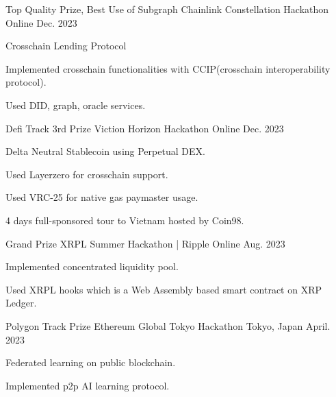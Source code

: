 




\begin{cventries}


\cventry
{Top Quality Prize, Best Use of Subgraph}
{Chainlink Constellation Hackathon}
{Online}
{Dec. 2023}
{
\begin{cvitems}
\item {Crosschain Lending Protocol}
\item {Implemented crosschain functionalities with CCIP(crosschain interoperability protocol).}
\item {Used DID, graph, oracle services.}
\end{cvitems}
}

\cventry
{Defi Track 3rd Prize}
{Viction Horizon Hackathon}
{Online}
{Dec. 2023}
{
\begin{cvitems}
\item {Delta Neutral Stablecoin using Perpetual DEX.}
\item {Used Layerzero for crosschain support.}
\item {Used VRC-25 for native gas paymaster usage.}
\item {4 days full-sponsored tour to Vietnam hosted by Coin98.}
\end{cvitems}
}

\cventry
{Grand Prize} %
{XRPL Summer Hackathon | Ripple} %
{Online} %
{Aug. 2023} %
{
\begin{cvitems}
\item {Implemented concentrated liquidity pool.}
\item {Used XRPL hooks which is a Web Assembly based smart contract on XRP Ledger.}
\end{cvitems}
}

\cventry
{Polygon Track Prize} %
{Ethereum Global Tokyo Hackathon} %
{Tokyo, Japan} %
{April. 2023} %
{
\begin{cvitems}
\item {Federated learning on public blockchain.}
\item {Implemented p2p AI learning protocol.}
\end{cvitems}
}


\end{cventries}

